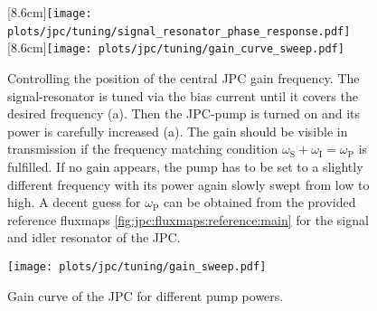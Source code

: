 \begin{figure}
\centering
{}
[8.6cm]{\texttt{[image: plots/jpc/tuning/signal\_resonator\_phase\_response.pdf]}}
~
[8.6cm]{\texttt{[image: plots/jpc/tuning/gain\_curve\_sweep.pdf]}}
\caption{Controlling the position of the central JPC gain frequency. The signal-resonator is tuned via the bias current until it covers the desired frequency (a). Then the JPC-pump is turned on and its power is carefully increased (a). The gain should be visible in transmission if the frequency matching condition $\omega_\text{S} + \omega_\text{I} = \omega_\text{P}$ is fulfilled. If no gain appears, the pump has to be set to a slightly different frequency with its power again slowly swept from low to high. A decent guess for $\omega_\text{P}$ can be obtained from the provided reference fluxmaps \ref{fig:jpc:fluxmaps:reference:main} for the signal and idler resonator of the JPC.}
\label{fig:jpc:tuning:main}
\end{figure}



\begin{figure}
\centering
{\texttt{[image: plots/jpc/tuning/gain\_sweep.pdf]}}
\caption{Gain curve of the JPC for different pump powers.
}
\label{fig:jpc:tuning:low_gain_to_high_gain}
\end{figure}





